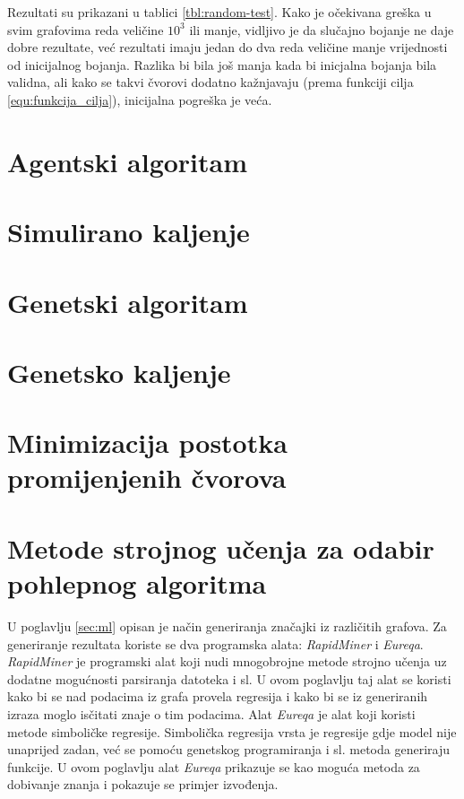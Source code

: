 \documentclass[times, utf8, diplomski, numeric]{fer}
\begin{document}
Rezultati su prikazani u tablici \ref{tbl:random-test}.
Kako je očekivana greška u svim grafovima reda veličine $10^3$ ili manje, vidljivo je da slučajno bojanje ne daje dobre rezultate, već rezultati imaju jedan do dva reda veličine manje vrijednosti od inicijalnog bojanja. Razlika bi bila još manja kada bi inicjalna bojanja bila validna, ali kako se takvi čvorovi dodatno kažnjavaju (prema funkciji cilja \ref{equ:funkcija_cilja}), inicijalna pogreška je veća.

\section{Agentski algoritam}

\section{Simulirano kaljenje}

\section{Genetski algoritam}

\section{Genetsko kaljenje}

\section{Minimizacija postotka promijenjenih čvorova}

\section{Metode strojnog učenja za odabir pohlepnog algoritma}

U poglavlju \ref{sec:ml} opisan je način generiranja značajki iz različitih grafova. Za generiranje rezultata koriste se dva programska alata: \emph{RapidMiner} i \emph{Eureqa}. \emph{RapidMiner} je programski alat koji nudi mnogobrojne metode strojno učenja uz dodatne mogućnosti parsiranja datoteka i sl. U ovom poglavlju taj alat se koristi kako bi se nad podacima iz grafa provela regresija i kako bi se iz generiranih izraza moglo isčitati znaje o tim podacima. Alat \emph{Eureqa} je alat koji koristi metode simboličke regresije. Simbolička regresija vrsta je regresije gdje model nije unaprijed zadan, već se pomoću genetskog programiranja i sl. metoda generiraju funkcije. U ovom poglavlju alat \emph{Eureqa} prikazuje se kao moguća metoda za dobivanje znanja i pokazuje se primjer izvođenja.
\end{document}
